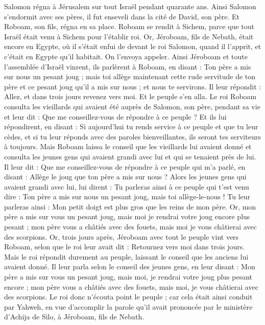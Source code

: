 \begin{multicols}{2}
Salomon régna à Jérusalem sur tout Israël pendant quarante ans.
Ainsi Salomon s'endormit avec ses pères, il fut enseveli dans la cité de David, son père. Et Roboam, son fils, régna en sa place.
\VerseOne{}Roboam se rendit à Sichem, parce que tout Israël était venu à Sichem pour l'établir roi.
Or, Jéroboam, fils de Nebath, était encore en Egypte, où il s'était enfui de devant le roi Salomon, quand il l'apprit, et c’était en Egypte qu’il habitait.
On l'envoya appeler. Ainsi Jéroboam et toute l'assemblée d'Israël vinrent, ils parlèrent à Roboam, en disant :
Ton père a mis sur nous un pesant joug ; mais toi allège maintenant cette rude servitude de ton père et ce pesant joug qu'il a mis sur nous ; et nous te servirons.
Il leur répondit : Allez, et dans trois jours revenez vers moi. Et le peuple s'en alla.
Le roi Roboam consulta les vieillards qui avaient été auprès de Salomon, son père, pendant sa vie et leur dit : Que me conseillez-vous de répondre à ce peuple ?
Et ils lui répondirent, en disant : Si aujourd'hui tu rends service à ce peuple et que tu leur cèdes, et si tu leur réponds avec des paroles bienveillantes, ils seront tes serviteurs à toujours.
Mais Roboam laissa le conseil que les vieillards lui avaient donné et consulta les jeunes gens qui avaient grandi avec lui et qui se tenaient près de lui.
Il leur dit : Que me conseillez-vous de répondre à ce peuple qui m'a parlé, en disant : Allège le joug que ton père a mis sur nous ?
Alors les jeunes gens qui avaient grandi avec lui, lui dirent : Tu parleras ainsi à ce peuple qui t'est venu dire : Ton père a mis sur nous un pesant joug, mais toi allège-le-nous ! Tu leur parleras ainsi : Mon petit doigt est plus gros que les reins de mon père.
Or, mon père a mis sur vous un pesant joug, mais moi je rendrai votre joug encore plus pesant ; mon père vous a châtiés avec des fouets, mais moi je vous châtierai avec des scorpions.
Or, trois jours après, Jéroboam avec tout le peuple vint vers Roboam, selon que le roi leur avait dit : Retournez vers moi dans trois jours.
Mais le roi répondit durement au peuple, laissant le conseil que les anciens lui avaient donné.
Il leur parla selon le conseil des jeunes gens, en leur disant : Mon père a mis sur vous un pesant joug, mais moi, je rendrai votre joug plus pesant encore ; mon père vous a châtiés avec des fouets, mais moi, je vous châtierai avec des scorpions.
Le roi donc n'écouta point le peuple ; car cela était ainsi conduit par Yahweh, en vue d’accomplir la parole qu'il avait prononcée par le ministère d'Achija de Silo, à Jéroboam, fils de Nebath.

\end{multicols}
